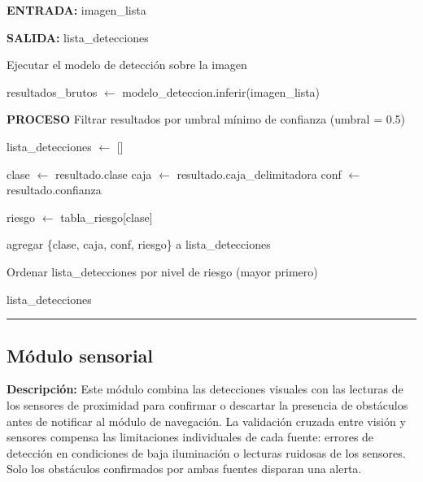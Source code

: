 \begin{algorithmic}[1]

\Statex \textbf{ENTRADA:}
\Statex imagen\_lista

\Statex
\Statex \textbf{SALIDA:}
\Statex lista\_detecciones

\Statex
\State Ejecutar el modelo de detección sobre la imagen

\State resultados\_brutos $\gets$
modelo\_deteccion.inferir(imagen\_lista)

\Statex
\Statex \textbf{PROCESO}
\State Filtrar resultados por umbral mínimo de confianza (umbral = 0.5)

\State lista\_detecciones $\gets$ []

\Statex



        \State clase $\gets$ resultado.clase
        \State caja $\gets$ resultado.caja\_delimitadora
        \State conf $\gets$ resultado.confianza


        \State riesgo $\gets$ tabla\_riesgo[clase] 

        \State agregar \{clase, caja, conf, riesgo\}
        \Statex \hspace{1.3cm} a lista\_detecciones

    \EndIf

\EndFor

\Statex
\State Ordenar lista\_detecciones por nivel de riesgo (mayor primero)

\Statex
\State \Return lista\_detecciones

\end{algorithmic}
\vspace{-0.9cm}
\rule{\textwidth}{0.4pt}

\subsection{Módulo sensorial}

\textbf{Descripción:}
Este módulo combina las detecciones visuales con las lecturas de los sensores de
proximidad para confirmar o descartar la presencia de obstáculos antes de notificar al
módulo de navegación. La validación cruzada entre visión y sensores compensa las
limitaciones individuales de cada fuente: errores de detección en condiciones de baja
iluminación o lecturas ruidosas de los sensores. Solo los obstáculos confirmados por
ambas fuentes disparan una alerta.

